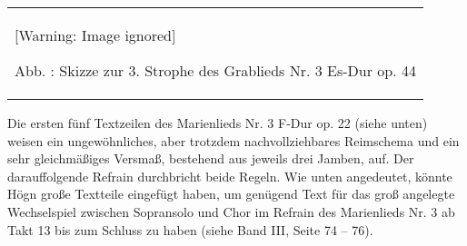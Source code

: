 \documentclass[a4paper]{article}
\newcounter{Abb}
\renewcommand\theAbb{\arabic{Abb}}
\begin{document}
\begin{center}
\begin{minipage}{10.264cm}
\begin{flushleft}
\tablefirsthead{}
\tablehead{}
\tabletail{}
\tablelasttail{}
\begin{supertabular}{m{10.064cm}}
  [Warning: Image ignored] %
 
Abb. \stepcounter{Abb}{\theAbb}: Skizze zur 3. Strophe des Grablieds Nr.
3 Es-Dur op. 44\\
\end{supertabular}
\end{flushleft}
\end{minipage}
\end{center}
Die ersten fünf Textzeilen des Marienlieds Nr. 3 F-Dur op. 22 (siehe
unten) weisen ein ungewöhnliches, aber trotzdem nachvollziehbares
Reimschema und ein sehr gleichmäßiges Versmaß, bestehend aus jeweils
drei Jamben, auf. Der darauffolgende Refrain durchbricht beide Regeln.
Wie unten angedeutet, könnte Högn große Textteile eingefügt haben, um
genügend Text für das groß angelegte Wechselspiel zwischen Sopransolo
und Chor im Refrain des Marienlieds Nr. 3 ab Takt 13 bis zum Schluss zu
haben (siehe Band III, Seite 74 – 76).
\end{document}
